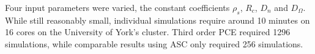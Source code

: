 Four input parameters were varied, the constant coefficients $\rho_s$, $R_c$,
$D_n$ and $D_{\Omega}$.
While still reasonably small, individual simulations require around 10 minutes
on 16 cores on the University of York's cluster.
Third order PCE required 1296 simulations, while comparable results using ASC
only required 256 simulations.


